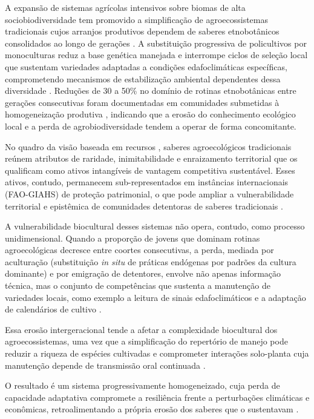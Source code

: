 \documentclass[12pt,a4paper]{article}
\begin{document}
A expansão de sistemas agrícolas intensivos sobre biomas de alta sociobiodiversidade tem promovido a simplificação de agroecossistemas tradicionais cujos arranjos produtivos dependem de saberes etnobotânicos consolidados ao longo de gerações \citep{Altieri2004}. A substituição progressiva de policultivos por monoculturas reduz a base genética manejada e interrompe ciclos de seleção local que sustentam variedades adaptadas a condições edafoclimáticas específicas, comprometendo mecanismos de estabilização ambiental dependentes dessa diversidade \citep{Jarvis2008}. Reduções de 30 a 50\% no domínio de rotinas etnobotânicas entre gerações consecutivas foram documentadas em comunidades submetidas à homogeneização produtiva \citep{ReyesGarcia2013}, indicando que a erosão do conhecimento ecológico local e a perda de agrobiodiversidade tendem a operar de forma concomitante.

No quadro da visão baseada em recursos \citep{Barney1991}, saberes agroecológicos tradicionais reúnem atributos de raridade, inimitabilidade e enraizamento territorial que os qualificam como ativos intangíveis de vantagem competitiva sustentável. Esses ativos, contudo, permanecem sub-representados em instâncias internacionais (FAO-GIAHS) de proteção patrimonial, o que pode ampliar a vulnerabilidade territorial e epistêmica de comunidades detentoras de saberes tradicionais \citep{Santilli2009,Cunha2009,Goncalves2022}.

A vulnerabilidade biocultural desses sistemas não opera, contudo, como processo unidimensional. Quando a proporção de jovens que dominam rotinas agroecológicas decresce entre coortes consecutivas, a perda, mediada por aculturação (substituição \textit{in situ} de práticas endógenas por padrões da cultura dominante) e por emigração de detentores, envolve não apenas informação técnica, mas o conjunto de competências que sustenta a manutenção de variedades locais, como exemplo a leitura de sinais edafoclimáticos e a adaptação de calendários de cultivo \citep{GomezBaggethun2013}.

Essa erosão intergeracional tende a afetar a complexidade biocultural dos agroecossistemas, uma vez que a simplificação do repertório de manejo pode reduzir a riqueza de espécies cultivadas e comprometer interações solo-planta cuja manutenção depende de transmissão oral continuada \citep{Brush2004,Bastos2022}. 

O resultado é um sistema progressivamente homogeneizado, cuja perda de capacidade adaptativa compromete a resiliência frente a perturbações climáticas e econômicas, retroalimentando a própria erosão dos saberes que o sustentavam \citep{Aniah2019}.
\end{document}
